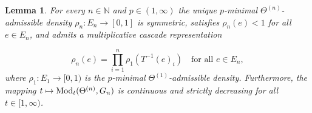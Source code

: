 \documentclass{amsart}
\newcommand{\Mod}{{\rm Mod}}
\newtheorem{lemma}[equation]{Lemma}
\numberwithin{equation}{section}
\theoremstyle{definition}
\theoremstyle{remark}
\newcommand{\N}{\mathbb{N}}
\begin{document}
\begin{lemma}\label{Lemma: Optimal Density}
    For every \(n\in\N\) and \(p\in(1,\infty)\) the unique \(p\)-minimal \(\Theta^{(n)}\)-admissible density \(\rho_n\colon E_n\to[0,1]\) is symmetric, satisfies \(\rho_n(e)<1\) for all \(e\in E_n\), and admits a multiplicative cascade representation
    
        \begin{equation}\label{Equation: Optimal density is a cascade}
            \rho_n(e)=\prod_{i=1}^n\rho_1(T^{-1}(e)_i)\quad\text{for all }e\in E_n,
        \end{equation}
    where \(\rho_1\colon E_1\to [0,1)\) is the \(p\)-minimal \(\Theta^{(1)}\)-admissible density. Furthermore, the mapping \(t\mapsto\Mod_t(\Theta^{(n)},G_n)\) is continuous and strictly decreasing for all \(t\in[1,\infty)\).
\end{lemma}
\end{document}
